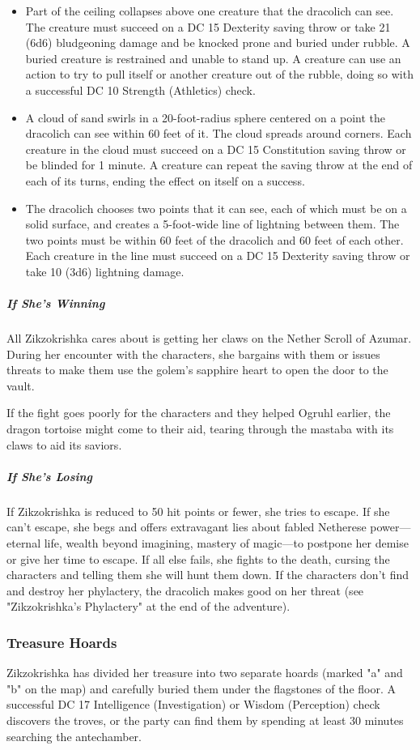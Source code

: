 \documentclass[10pt,a4paper,twoside,bg=print,twocolumn,openany,nodeprecatedcode]{dndbook}
\begin{document}
\begin{itemize}
\item Part of the ceiling collapses above one creature that the dracolich can see. The creature must succeed on a DC 15 Dexterity saving throw or take 21 (6d6) bludgeoning damage and be knocked prone and buried under rubble. A buried creature is restrained and unable to stand up. A creature can use an action to try to pull itself or another creature out of the rubble, doing so with a successful DC 10 Strength (Athletics) check.
\item A cloud of sand swirls in a 20-foot-radius sphere centered on a point the dracolich can see within 60 feet of it. The cloud spreads around corners. Each creature in the cloud must succeed on a DC 15 Constitution saving throw or be blinded for 1 minute. A creature can repeat the saving throw at the end of each of its turns, ending the effect on itself on a success.
\item The dracolich chooses two points that it can see, each of which must be on a solid surface, and creates a 5-foot-wide line of lightning between them. The two points must be within 60 feet of the dracolich and 60 feet of each other. Each creature in the line must succeed on a DC 15 Dexterity saving throw or take 10 (3d6) lightning damage.
\end{itemize}

\subparagraph{If She's Winning}
All Zikzokrishka cares about is getting her claws on the Nether Scroll of Azumar. During her encounter with the characters, she bargains with them or issues threats to make them use the golem's sapphire heart to open the door to the vault.

If the fight goes poorly for the characters and they helped Ogruhl earlier, the dragon tortoise might come to their aid, tearing through the mastaba with its claws to aid its saviors.

\subparagraph{If She's Losing}
If Zikzokrishka is reduced to 50 hit points or fewer, she tries to escape. If she can't escape, she begs and offers extravagant lies about fabled Netherese power—eternal life, wealth beyond imagining, mastery of magic—to postpone her demise or give her time to escape. If all else fails, she fights to the death, cursing the characters and telling them she will hunt them down. If the characters don't find and destroy her phylactery, the dracolich makes good on her threat (see "Zikzokrishka's Phylactery" at the end of the adventure).

\subsubsection{Treasure Hoards}
Zikzokrishka has divided her treasure into two separate hoards (marked "a" and "b" on the map) and carefully buried them under the flagstones of the floor. A successful DC 17 Intelligence (Investigation) or Wisdom (Perception) check discovers the troves, or the party can find them by spending at least 30 minutes searching the antechamber.
\end{document}
